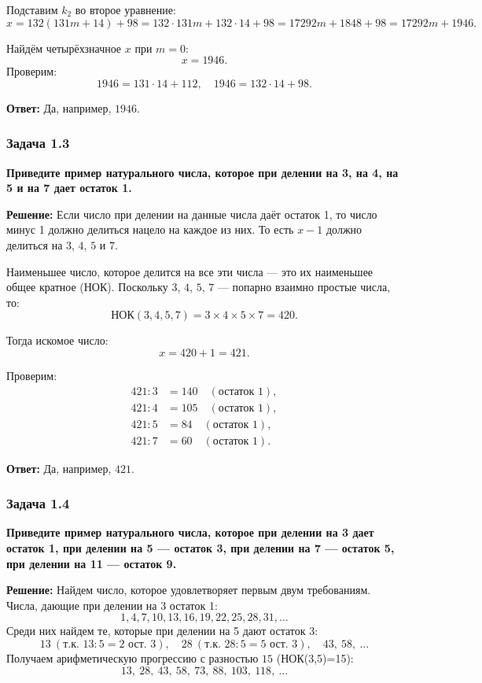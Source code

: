 \documentclass[12pt, a4paper]{article}
\begin{document}
Подставим $k_2$ во второе уравнение:
\[
x = 132(131m + 14) + 98 = 132 \cdot 131m + 132 \cdot 14 + 98 = 17292m + 1848 + 98 = 17292m + 1946.
\]

Найдём четырёхзначное $x$ при $m = 0$:
\[
x = 1946.
\]
Проверим:
\[
1946 = 131 \cdot 14 + 112, \quad 1946 = 132 \cdot 14 + 98.
\]

\textbf{Ответ:} Да, например, $1946$.

\subsubsection*{Задача 1.3}
\textbf{Приведите пример натурального числа, которое при делении на 3, на 4, на 5 и на 7 дает остаток 1.}

\textbf{Решение:}
Если число при делении на данные числа даёт остаток 1, то число минус 1 должно делиться нацело на каждое из них. То есть $x - 1$ должно делиться на $3$, $4$, $5$ и $7$.

Наименьшее число, которое делится на все эти числа — это их наименьшее общее кратное (НОК). Поскольку $3$, $4$, $5$, $7$ — попарно взаимно простые числа, то:
\[
\text{НОК}(3, 4, 5, 7) = 3 \times 4 \times 5 \times 7 = 420.
\]

Тогда искомое число:
\[
x = 420 + 1 = 421.
\]

Проверим:
\begin{align*}
421 : 3 &= 140 \quad (\text{остаток } 1), \\
421 : 4 &= 105 \quad (\text{остаток } 1), \\
421 : 5 &= 84 \quad (\text{остаток } 1), \\
421 : 7 &= 60 \quad (\text{остаток } 1).
\end{align*}

\textbf{Ответ:} Да, например, $421$.

\subsubsection*{Задача 1.4}
\textbf{Приведите пример натурального числа, которое при делении на 3 дает остаток 1, при делении на 5 — остаток 3, при делении на 7 — остаток 5, при делении на 11 — остаток 9.}

\textbf{Решение:}
Найдем число, которое удовлетворяет первым двум требованиям. Числа, дающие при делении на 3 остаток 1: 
\[
1, 4, 7, 10, 13, 16, 19, 22, 25, 28, 31, \ldots
\]
Среди них найдем те, которые при делении на 5 дают остаток 3:
\[
13 \ (\text{т.к. } 13 : 5 = 2 \text{ ост. } 3),\quad 
28 \ (\text{т.к. } 28 : 5 = 5 \text{ ост. } 3),\quad 
43,\ 58,\ \ldots
\]
Получаем арифметическую прогрессию с разностью $15$ (НОК(3,5)=15):
\[
13,\ 28,\ 43,\ 58,\ 73,\ 88,\ 103,\ 118,\ \ldots
\]
\end{document}
